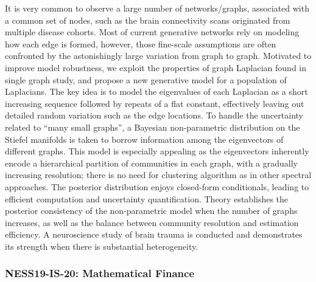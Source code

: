 \begin{itemize}
It is very common to observe a large number of networks/graphs, associated with a common set of nodes, such as the brain connectivity scans originated from multiple disease cohorts. Most of current generative networks rely on modeling how each edge is formed, however, those fine-scale assumptions are often confronted by the astonishingly large variation from graph to graph. Motivated to improve model robustness, we exploit the properties of graph Laplacian found in single graph study, and propose a new generative model for a population of Laplacians. The key idea is to model the eigenvalues of each Laplacian as a short increasing sequence followed by repeats of a flat constant, effectively leaving out detailed random variation such as the edge locations. To handle the uncertainty related to ``many small graphs'', a Bayesian non-parametric distribution on the Stiefel manifolds is taken to borrow information among the eigenvectors of different graphs. This model is especially appealing as the eigenvectors inherently encode a hierarchical partition of communities in each graph, with a gradually increasing resolution; there is no need for clustering algorithm as in other spectral approaches. The posterior distribution enjoys closed-form conditionals, leading to efficient computation and uncertainty quantification. Theory establishes the posterior consistency of the non-parametric model when the number of graphs increases, as well as the balance between community resolution and estimation efficiency. A neuroscience study of brain trauma is conducted and demonstrates its strength when there is substantial heterogeneity.

\end{itemize}

\subsubsection*{NESS19-IS-20: Mathematical Finance}

